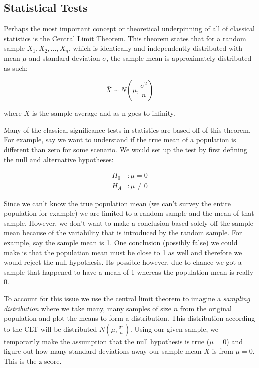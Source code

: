 \subsection{Statistical Tests}

Perhaps the most important concept or theoretical underpinning of all of classical statistics is the Central Limit Theorem. This theorem states that for a random sample $X_1, X_2, ..., X_n$, which is identically and independently distributed with mean $\mu$ and standard deviation $\sigma$, the sample mean is approximately distributed as such:

\begin{equation}
\bar{X} \sim N(\mu, \frac{\sigma^2}{n})
\end{equation}

\noindent where $\bar{X}$ is the sample average and as n goes to infinity.

Many of the classical significance tests in statistics are based off of this theorem. For example, say we want to understand if the true mean of a population is different than zero for some scenario. We would set up the test by first defining the null and alternative hypotheses:

\begin{equation}
\begin{split}
H_0 &: \mu = 0 \\
H_A &:  \mu \neq 0
\end{split}
\end{equation}

\noindent Since we can't know the true population mean (we can't survey the entire population for example) we are limited to a random sample and the mean of that sample. However, we don't want to make a conclusion based solely off the sample mean because of the variability that is introduced by the random sample. For example, say the sample mean is 1. One conclusion (possibly false) we could make is that the population mean must be close to 1 as well and therefore we would reject the null hypothesis. Its possible however, due to chance we got a sample that happened to have a mean of 1 whereas the population mean is really 0.

To account for this issue we use the central limit theorem to imagine a \emph{sampling distribution} where we take many, many samples of size $n$ from the original population and plot the means to form a distribution. This distribution according to the CLT will be distributed $N(\mu, \frac{\sigma^2}{n})$. Using our given sample, we temporarily make the assumption that the null hypothesis is true ($\mu=0$) and figure out how many standard deviations away our sample mean $\bar{X}$ is from $\mu=0$. This is the z-score.

